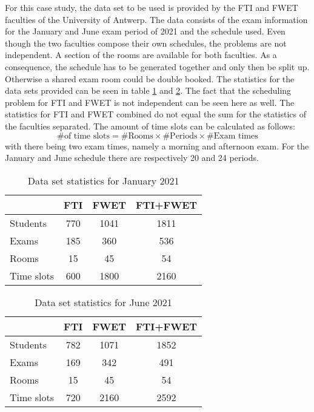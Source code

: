 For this case study, the data set to be used is provided by the FTI and FWET faculties of the University of Antwerp. The data consists of the exam information for the January and June exam period of 2021 and the schedule used. Even though the two faculties compose their own schedules, the problems are not independent. A section of the rooms are available for both faculties. As a consequence, the schedule has to be generated together and only then be split up. Otherwise a shared exam room could be double booked. The statistics for the data sets provided can be seen in table \ref{tab:data_set_sem1} and \ref{tab:data_set_sem2}. The fact that the scheduling problem for FTI and FWET is not independent can be seen here as well. The statistics for FTI and FWET combined do not equal the sum for the statistics of the faculties separated. The amount of time slots can be calculated as follows:
\begin{equation}
    \text{\# of time slots} = \text{\# Rooms} \times \text{\# Periods} \times \text{\# Exam times}  
\end{equation}
with there being two exam times, namely a morning and afternoon exam. For the January and June schedule there are respectively 20 and 24 periods.
\begin{table}[h]
	\caption{Data set statistics for January 2021}
	\label{tab:data_set_sem1}
	\centering
	\begin{tabular}{l c c c }
		\hline
		& \textbf{FTI} & \textbf{FWET} & \textbf{FTI+FWET} \\ \hline
		Students & 770 & 1041 & 1811 \\
		Exams & 185 & 360 & 536 \\
	    Rooms & 15 & 45 & 54 \\
        Time slots & 600 & 1800 & 2160 \\ \hline
	\end{tabular}
\end{table}

\begin{table}[h]
	\caption{Data set statistics for June 2021}
	\label{tab:data_set_sem2}
	\centering
	\begin{tabular}{l c c c }
		\hline
		& \textbf{FTI} & \textbf{FWET} & \textbf{FTI+FWET} \\ \hline
		Students & 782 & 1071 & 1852 \\
		Exams & 169 & 342 & 491 \\
	    Rooms & 15 & 45 & 54 \\
        Time slots & 720 & 2160 & 2592 \\ \hline
	\end{tabular}
\end{table}

